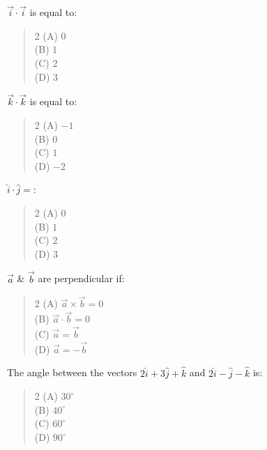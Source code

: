 \documentclass[11pt,a4paper]{article}
\begin{document}
\begin{mcqlist}
\item $\vec{i}\cdot\vec{i}$ is equal to:
\begin{quote}\begin{multicols}{2}
\noindent (A) $0$ \\
(B) $1$ \\
(C) $2$ \\
(D) $3$
\end{multicols}\end{quote}

\item $\vec{k}\cdot\vec{k}$ is equal to:
\begin{quote}\begin{multicols}{2}
\noindent (A) $-1$ \\
(B) $0$ \\
(C) $1$ \\
(D) $-2$
\end{multicols}\end{quote}

\item $\hat{i}\cdot\hat{j}=$:
\begin{quote}\begin{multicols}{2}
\noindent (A) $0$ \\
(B) $1$ \\
(C) $2$ \\
(D) $3$
\end{multicols}\end{quote}

\item $\vec{a}$ \& $\vec{b}$ are perpendicular if:
\begin{quote}\begin{multicols}{2}
\noindent (A) $\vec{a}\times\vec{b}=0$ \\
(B) $\vec{a}\cdot\vec{b}=0$ \\
(C) $\vec{a}=\vec{b}$ \\
(D) $\vec{a}=-\vec{b}$
\end{multicols}\end{quote}

\item The angle between the vectors $2\hat{i}+3\hat{j}+\hat{k}$ and $2\hat{i}-\hat{j}-\hat{k}$ is:
\begin{quote}\begin{multicols}{2}
\noindent (A) $30^\circ$ \\
(B) $40^\circ$ \\
(C) $60^\circ$ \\
(D) $90^\circ$
\end{multicols}\end{quote}


\end{mcqlist}
\end{document}
